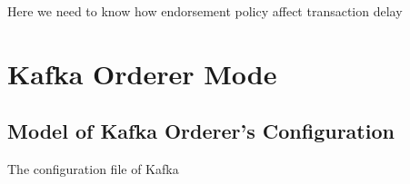 \documentclass[10pt,journal,compsoc, twoside]{IEEEtran}
\begin{document}
Here we need to know how endorsement policy affect transaction delay





\section{Kafka Orderer Mode}


\subsection{Model of Kafka Orderer's Configuration}

The configuration file of Kafka




\ifCLASSOPTIONcaptionsoff
  \newpage
\fi





\vspace{240pt}
\end{document}
